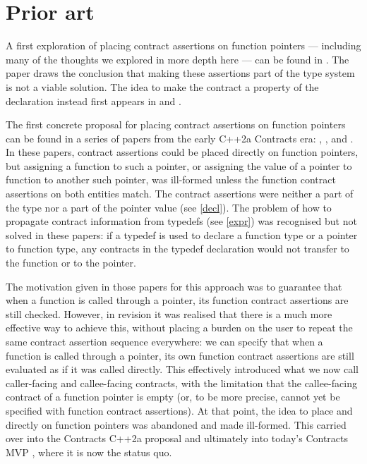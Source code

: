 
\section{Prior art}
\label{priorart}

A first exploration of placing contract assertions on function pointers --- including many of the thoughts we explored in more depth here --- can be found in \cite{N4110}. The paper draws the conclusion that making these assertions part of the type system is not a viable solution. The idea to make the contract a property of the declaration instead first appears in  \cite{P0246R0} and \cite{P0247R0}.

The first concrete proposal for placing contract assertions on function pointers can be found in a series of papers from the early C++2a Contracts era: \cite{N4415}, \cite{P0287R0}, and \cite{P0380R0}. In these papers, contract assertions could be placed directly on function pointers, but assigning a function to such a pointer, or assigning the value of a pointer to function to another such pointer, was ill-formed unless the function contract assertions on both entities match. The contract assertions were neither a part of the type nor a part of the pointer value (see \ref{decl}). The problem of how to propagate contract information from typedefs (see \ref{expr}) was recognised but not solved in these papers:  if a typedef is used to declare a function type or a pointer to function type, any contracts in the typedef declaration would not transfer to the function or to the pointer.

The motivation given in those papers for this approach was to guarantee that when a function is called through a pointer, its function contract assertions are still checked. However, in revision \cite{P0380R1} it was realised that there is a much more effective way to achieve this, without placing a burden on the user to repeat the same contract assertion sequence everywhere: we can specify that when a function is called through a pointer, its own function contract assertions are still evaluated as if it was called directly. This effectively introduced what we now call caller-facing and callee-facing contracts, with the limitation that the callee-facing contract of a function pointer is empty (or, to be more precise, cannot yet be specified with function contract assertions). At that point, the idea to place  and  directly on function pointers was abandoned and made ill-formed. This carried over into the Contracts C++2a proposal \cite{P0542R5} and ultimately into today's Contracts MVP \cite{P2900R8}, where it is now the status quo.

